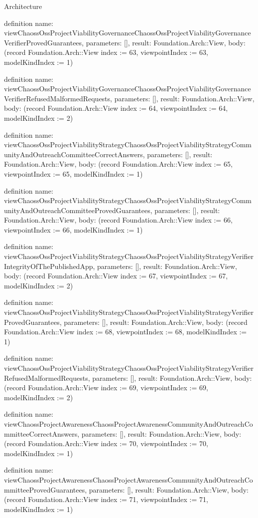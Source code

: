 \begin{lexlean}{Architecture}
\begin{semanticmodule}
definition{
  name: viewChaossOssProjectViabilityGovernanceChaossOssProjectViabilityGovernanceVerifierProvedGuarantees,
  parameters: [],
  result: Foundation.Arch::View,
  body: (record Foundation.Arch::View {index := 63, viewpointIndex := 63, modelKindIndex := 1})
}

definition{
  name: viewChaossOssProjectViabilityGovernanceChaossOssProjectViabilityGovernanceVerifierRefusedMalformedRequests,
  parameters: [],
  result: Foundation.Arch::View,
  body: (record Foundation.Arch::View {index := 64, viewpointIndex := 64, modelKindIndex := 2})
}

definition{
  name: viewChaossOssProjectViabilityStrategyChaossOssProjectViabilityStrategyCommunityAndOutreachCommitteeCorrectAnswers,
  parameters: [],
  result: Foundation.Arch::View,
  body: (record Foundation.Arch::View {index := 65, viewpointIndex := 65, modelKindIndex := 1})
}

definition{
  name: viewChaossOssProjectViabilityStrategyChaossOssProjectViabilityStrategyCommunityAndOutreachCommitteeProvedGuarantees,
  parameters: [],
  result: Foundation.Arch::View,
  body: (record Foundation.Arch::View {index := 66, viewpointIndex := 66, modelKindIndex := 1})
}

definition{
  name: viewChaossOssProjectViabilityStrategyChaossOssProjectViabilityStrategyVerifierIntegrityOfThePublishedApp,
  parameters: [],
  result: Foundation.Arch::View,
  body: (record Foundation.Arch::View {index := 67, viewpointIndex := 67, modelKindIndex := 2})
}

definition{
  name: viewChaossOssProjectViabilityStrategyChaossOssProjectViabilityStrategyVerifierProvedGuarantees,
  parameters: [],
  result: Foundation.Arch::View,
  body: (record Foundation.Arch::View {index := 68, viewpointIndex := 68, modelKindIndex := 1})
}

definition{
  name: viewChaossOssProjectViabilityStrategyChaossOssProjectViabilityStrategyVerifierRefusedMalformedRequests,
  parameters: [],
  result: Foundation.Arch::View,
  body: (record Foundation.Arch::View {index := 69, viewpointIndex := 69, modelKindIndex := 2})
}

definition{
  name: viewChaossProjectAwarenessChaossProjectAwarenessCommunityAndOutreachCommitteeCorrectAnswers,
  parameters: [],
  result: Foundation.Arch::View,
  body: (record Foundation.Arch::View {index := 70, viewpointIndex := 70, modelKindIndex := 1})
}

definition{
  name: viewChaossProjectAwarenessChaossProjectAwarenessCommunityAndOutreachCommitteeProvedGuarantees,
  parameters: [],
  result: Foundation.Arch::View,
  body: (record Foundation.Arch::View {index := 71, viewpointIndex := 71, modelKindIndex := 1})
}


\end{semanticmodule}
\end{lexlean}
